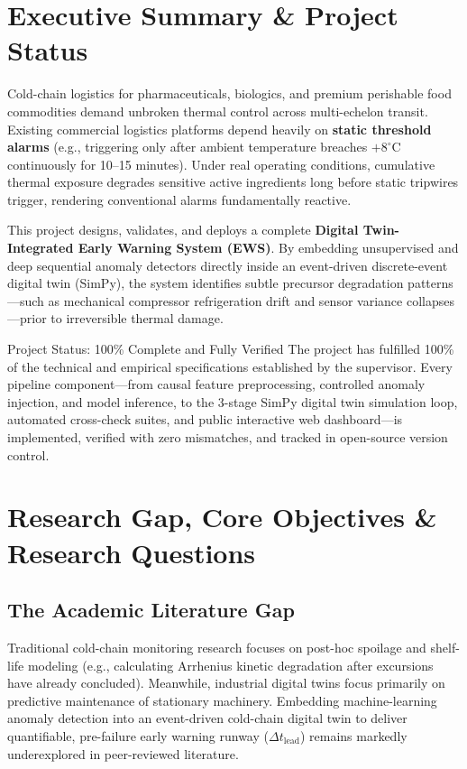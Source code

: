 \documentclass[11pt,a4paper,oneside]{article}
\begin{document}
\section{Executive Summary \& Project Status}

Cold-chain logistics for pharmaceuticals, biologics, and premium perishable food commodities demand unbroken thermal control across multi-echelon transit. Existing commercial logistics platforms depend heavily on \textbf{static threshold alarms} (e.g., triggering only after ambient temperature breaches $+8^\circ\text{C}$ continuously for 10--15 minutes). Under real operating conditions, cumulative thermal exposure degrades sensitive active ingredients long before static tripwires trigger, rendering conventional alarms fundamentally reactive.

This project designs, validates, and deploys a complete \textbf{Digital Twin-Integrated Early Warning System (EWS)}. By embedding unsupervised and deep sequential anomaly detectors directly inside an event-driven discrete-event digital twin (SimPy), the system identifies subtle precursor degradation patterns—such as mechanical compressor refrigeration drift and sensor variance collapses—prior to irreversible thermal damage.

\begin{calloutbox}{Project Status: 100\% Complete and Fully Verified}
The project has fulfilled 100\% of the technical and empirical specifications established by the supervisor. Every pipeline component—from causal feature preprocessing, controlled anomaly injection, and model inference, to the 3-stage SimPy digital twin simulation loop, automated cross-check suites, and public interactive web dashboard—is implemented, verified with zero mismatches, and tracked in open-source version control.
\end{calloutbox}

\section{Research Gap, Core Objectives \& Research Questions}

\subsection{The Academic Literature Gap}
Traditional cold-chain monitoring research focuses on post-hoc spoilage and shelf-life modeling (e.g., calculating Arrhenius kinetic degradation after excursions have already concluded). Meanwhile, industrial digital twins focus primarily on predictive maintenance of stationary machinery. Embedding machine-learning anomaly detection into an event-driven cold-chain digital twin to deliver quantifiable, pre-failure early warning runway ($\Delta t_{\text{lead}}$) remains markedly underexplored in peer-reviewed literature.
\end{document}
